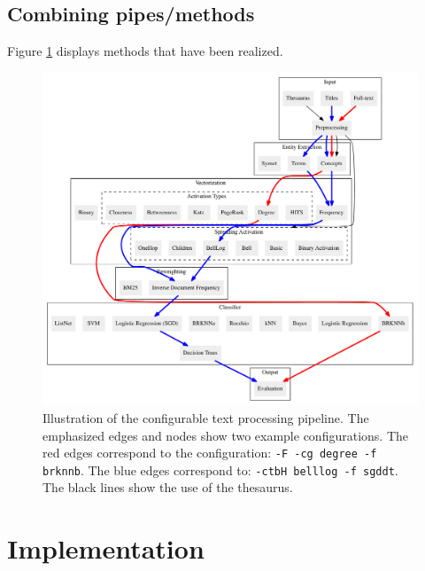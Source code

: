\documentclass{article}
\begin{document}
\subsection{Combining pipes/methods}
Figure \ref{fig:pipeline} displays methods that have been realized.
\begin{figure}[thb!]
    \centering
    \includegraphics[width=\textwidth]{graphics/pipelineExtended.pdf}
    \caption{
      Illustration of the configurable text processing pipeline.
      The emphasized edges and nodes show two example configurations.
      The red edges correspond to the configuration: \texttt{-F -cg degree -f brknnb}.
      The blue edges correspond to: \texttt{-ctbH belllog -f sgddt}.
      The black lines show the use of the thesaurus.
    }
    \label{fig:pipeline}
  \end{figure}

\section{Implementation}\label{implementation}
\end{document}

